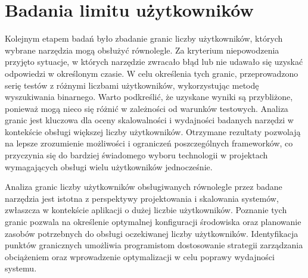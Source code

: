 \section{Badania limitu użytkowników}

Kolejnym etapem badań było zbadanie granic liczby użytkowników, których wybrane narzędzia mogą obsłużyć równolegle.
Za kryterium niepowodzenia przyjęto sytuacje, w których narzędzie zwracało błąd lub nie udawało się uzyskać odpowiedzi w określonym czasie.
W celu określenia tych granic, przeprowadzono serię testów z różnymi liczbami użytkowników, wykorzystując metodę wyszukiwania binarnego.
Warto podkreślić, że uzyskane wyniki są przybliżone, ponieważ mogą nieco się różnić w zależności od warunków testowych.
Analiza granic jest kluczowa dla oceny skalowalności i wydajności badanych narzędzi w kontekście obsługi większej liczby użytkowników.
Otrzymane rezultaty pozwolają na lepsze zrozumienie możliwości i ograniczeń poszczególnych frameworków, co przyczynia się do bardziej świadomego wyboru technologii w projektach wymagających obsługi wielu użytkowników jednocześnie.

Analiza granic liczby użytkowników obsługiwanych równolegle przez badane narzędzia jest istotna z perspektywy projektowania i skalowania systemów, zwłaszcza w kontekście aplikacji o dużej liczbie użytkowników.
Poznanie tych granic pozwala na określenie optymalnej konfiguracji środowiska oraz planowanie zasobów potrzebnych do obsługi oczekiwanej liczby użytkowników.
Identyfikacja punktów granicznych umożliwia programistom dostosowanie strategii zarządzania obciążeniem oraz wprowadzenie optymalizacji w celu poprawy wydajności systemu.
